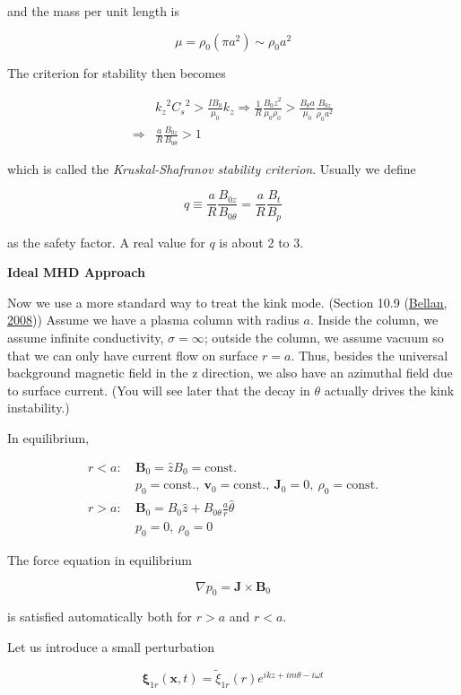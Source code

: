\documentclass[
  notoc %
]{tufte-book}
\begin{document}
and the mass per unit length is

\[
\mu =\rho_0(\pi a^2) \sim \rho_0 a^2
\]

The criterion for stability then becomes

\[
\begin{aligned}
&{k_z}^2{C_s}^2 >\frac{IB_0}{\mu_0}k_z\Rightarrow \frac{1}{R}\frac{{B_0z}^2}{\mu_0\rho_0}>\frac{B_\theta a}{\mu_0}\frac{B_{0z}}{\rho_0 a^2} \\
\Rightarrow &\frac{a}{R}\frac{B_{0z}}{B_{0\theta}}>1
\end{aligned}
\]

which is called the \emph{Kruskal-Shafranov stability criterion}.
Usually we define

\[
q\equiv\frac{a}{R}\frac{B_{0z}}{B_{0\theta}}=\frac{a}{R}\frac{B_t}{B_p}
\]

as the safety factor. A real value for \(q\) is about 2 to 3.

\textbf{Ideal MHD Approach}

Now we use a more standard way to treat the kink mode. (Section 10.9
(\protect\hyperlink{ref-bellan2008fundamentals}{Bellan, 2008})) Assume
we have a plasma column with radius \(a\). Inside the column, we assume
infinite conductivity, \(\sigma=\infty\); outside the column, we assume
vacuum so that we can only have current flow on surface \(r=a\). Thus,
besides the universal background magnetic field in the z direction, we
also have an azimuthal field due to surface current. (You will see later
that the decay in \(\theta\) actually drives the kink instability.)

In equilibrium,

\[
\begin{aligned}
r<a:\ &\mathbf{B}_0 = \hat{z}B_0 = \text{const.} \\
& p_0 = \text{const.},\ \mathbf{v}_0 = \text{const.},\ \mathbf{J}_0 = 0,\ \rho_0=\text{const.} \\
r>a:\ & \mathbf{B}_0 = B_0\hat{z} + B_{0\theta}\frac{a}{r}\hat{\theta} \\
& p_0=0,\ \rho_0 = 0
\end{aligned}
\]

The force equation in equilibrium

\[
\nabla p_0 = \mathbf{J}\times\mathbf{B}_0
\]

is satisfied automatically both for \(r>a\) and \(r<a\).

Let us introduce a small perturbation

\[
\pmb{\xi}_{1r}(\mathbf{x},t) = \widetilde{\xi}_{1r}(r)e^{ikz + im\theta-i\omega t}
\]
\end{document}
